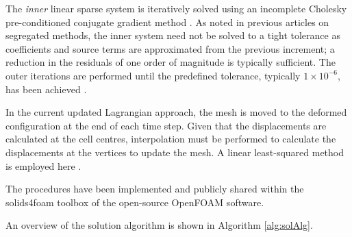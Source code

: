 \documentclass[sn-mathphys,Numbered,draft]{sn-jnl}%
\begin{document}
The \emph{inner} linear sparse system is iteratively solved using an incomplete Cholesky pre-conditioned conjugate gradient method \cite{jacobs_generalization_1986}.
As noted in previous articles on segregated methods, the inner system need not be solved to a tight tolerance as coefficients and source terms are approximated from the previous increment; a reduction in the residuals of one order of magnitude is typically sufficient. The outer iterations are performed until the predefined tolerance, typically $1 \times 10^{-6}$, has been achieved \cite{cardiff_lagrangian_2017}. 

In the current updated Lagrangian approach, the mesh is moved to the deformed configuration at the end of each time step.
Given that the displacements are calculated at the cell centres, interpolation must be performed to calculate the displacements at the vertices to update the mesh. A linear least-squared method is employed here \cite{cardiff_lagrangian_2017}.

The procedures have been implemented and publicly shared within the solids4foam toolbox \citep{Cardiff2018, Tukovic2018} of the open-source OpenFOAM software.

An overview of the solution algorithm is shown in Algorithm \ref{alg:solAlg}.
 
\end{document}
